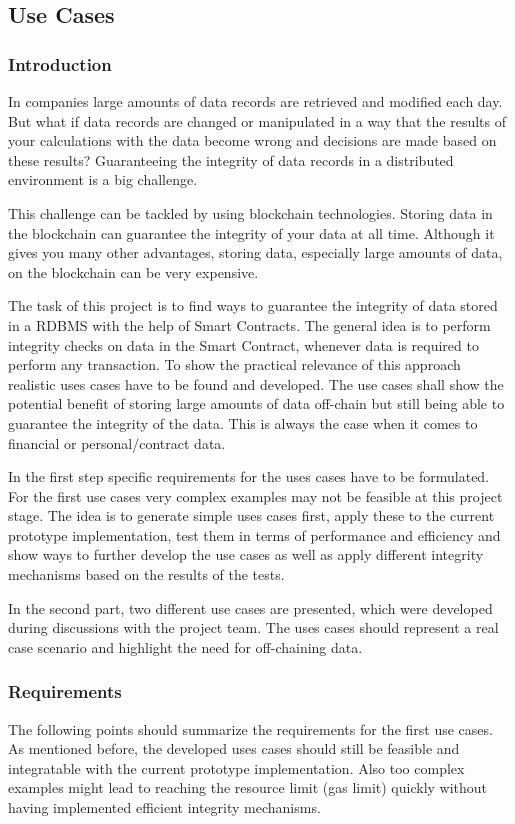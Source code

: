 \subsection{Use Cases} \label{sssec:use_cases}

\subsubsection{Introduction}
In companies large amounts of data records are retrieved and modified each day. But what if data records are changed or manipulated in a way that the results of your calculations with the data become wrong and decisions are made based on these results? Guaranteeing the integrity of data records in a distributed environment is a big challenge.

This challenge can be tackled by using blockchain technologies. Storing data in the blockchain can guarantee the integrity of your data at all time. Although it gives you many other advantages, storing data, especially large amounts of data, on the blockchain can be very expensive.

The task of this project is to find ways to guarantee the integrity of data stored in a RDBMS with the help of Smart Contracts. The general idea is to perform integrity checks on data in the Smart Contract, whenever data is required to perform any transaction. To show the practical relevance of this approach realistic uses cases have to be found and developed. The use cases shall show the potential benefit of storing large amounts of data off-chain but still being able to guarantee the integrity of the data. This is always the case when it comes to financial or personal/contract data.

In the first step specific requirements for the uses cases have to be formulated. For the first use cases very complex examples may not be feasible at this project stage. The idea is to generate simple uses cases first, apply these to the current prototype implementation, test them in terms of performance and efficiency and show ways to further develop the use cases as well as apply different integrity mechanisms based on the results of the tests.

In the second part, two different use cases are presented, which were developed during discussions with the project team. The uses cases should represent a real case scenario and highlight the need for off-chaining data.

\subsubsection{Requirements}
The following points should summarize the requirements for the first use cases. As mentioned before, the developed uses cases should still be feasible and integratable with the current prototype implementation. Also too complex examples might lead to reaching the resource limit (gas limit) quickly without having implemented efficient integrity mechanisms.

